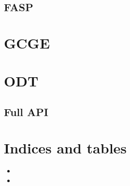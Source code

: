 \documentclass[letterpaper,10pt,english]{sphinxmanual}
\begin{document}
\section{FASP}
\label{\detokenize{src/opencaeplus/main:fasp}}
\sphinxstepscope


\chapter{GCGE}
\label{\detokenize{src/gcge/main:gcge}}\label{\detokenize{src/gcge/main::doc}}
\sphinxstepscope


\chapter{ODT}
\label{\detokenize{api/library_root:odt}}\label{\detokenize{api/library_root::doc}}

\section{Full API}
\label{\detokenize{api/library_root:full-api}}

\chapter{Indices and tables}
\label{\detokenize{index:indices-and-tables}}\begin{itemize}
\item {} 
\sphinxAtStartPar
{}

\item {} 
\sphinxAtStartPar
{}

\end{itemize}



\renewcommand{\indexname}{Index}
\printindex
\end{document}
